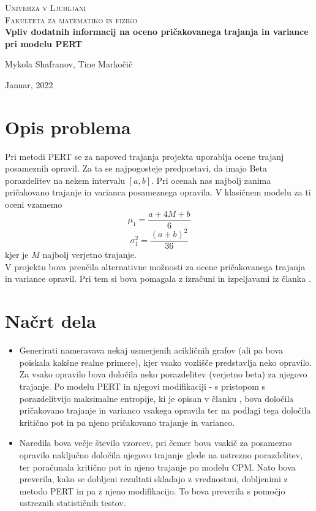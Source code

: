 \documentclass[12pt, a4paper]{article}
\begin{document}
\begin{titlepage}
    \center
    \textsc{\LARGE Univerza v Ljubljani}\\[0.6cm]
    \textsc{\Large Fakulteta za matematiko in fiziko}\\[0.6cm]
    
    {\huge\bfseries Vpliv dodatnih informacij na oceno pričakovanega trajanja in variance pri modelu PERT}\\[0.4cm]
    
    
    \vfill\vfill\vfill
    
    { Mykola Shafranov, Tine Markočič}
    
    { Januar, 2022}
    
    \vfill
    
\end{titlepage}
    
\tableofcontents
    
\newpage



\section{Opis problema}
Pri metodi PERT se za napoved trajanja projekta uporablja ocene trajanj posameznih opravil. 
Za ta se najpogosteje predpostavi, da imajo Beta porazdelitev na nekem intervalu $[a,b]$. 
Pri ocenah nas najbolj zanima pričakovano trajanje in varianca posameznega opravila. V klasičnem
modelu za ti oceni vzamemo
$$\mu_1 = \frac{a + 4M + b}{6}$$
$$\sigma_1^2 = \frac{(a + b)^2}{36}$$
kjer je $M$ najbolj verjetno trajanje. \\

V projektu bova preučila alternativne možnosti za ocene pričakovanega trajanja in variance opravil.
Pri tem si bova pomagala z izračuni in izpeljavami iz članka \cite{clanek}.


\section{Načrt dela}
\begin{itemize}
\item Generirati nameravava nekaj usmerjenih acikličnih grafov (ali pa bova poiskala kakšne realne primere), 
kjer vsako vozlišče predstavlja neko opravilo. Za vsako opravilo bova določila neko porazdelitev 
(verjetno beta) za njegovo trajanje. Po modelu PERT in njegovi modifikaciji - s pristopom s porazdelitvijo 
maksimalne entropije, ki je opisan v članku \cite{clanek}, bova določila pričakovano trajanje in varianco
vsakega opravila ter na podlagi tega določila kritično pot in pa njeno pričakovano trajanje in varianco.
\item Naredila bova večje število vzorcev, pri čemer bova vsakič za posamezno opravilo naključno določila 
njegovo trajanje glede na ustrezno porazdelitev, ter poračunala kritično pot in njeno trajanje po modelu CPM.
Nato bova preverila, kako se dobljeni rezultati skladajo z vrednostmi, dobljenimi z metodo PERT in pa z
njeno modifikacijo. To bova preverila s pomočjo ustreznih statističnih testov.
\end{itemize}
\end{document}
